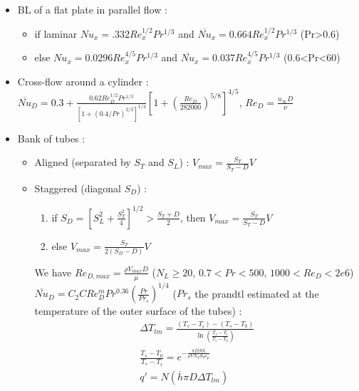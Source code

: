 \documentclass[../main.tex]{subfiles}
\begin{document}
\begin{itemize}
    \item BL of a flat plate in parallel flow : \begin{itemize}
        \item if laminar $Nu_x = .332 Re_x^{1/2} Pr^{1/3}$ and $\overline{Nu}_x = 0.664 Re_x^{1/2} Pr^{1/3}$ (Pr>0.6)\\
        \item else $Nu_x = 0.0296 Re_x^{4/5} Pr^{1/3}$ and $\overline{Nu}_x = 0.037 Re_x^{4/5} Pr^{1/3}$ (0.6<Pr<60)\\
    \end{itemize}
    \item Cross-flow around a cylinder : $\overline{Nu}_D = 0.3 + \frac{0.62Re_D^{1/2} Pr^{1/3}}{[1+(0.4/Pr)^{2/3}]^{1/4}} [1+(\frac{Re_D}{282000})^{5/8}]^{4/5}$, $Re_D = \frac{u_\infty D}{\nu}$\\
    \item Bank of tubes : \begin{itemize}
        \item Aligned (separated by $S_T$ and $S_L$) : $V_{max} = \frac{S_T}{S_T-D}V$\\
        \item Staggered (diagonal $S_D$) : \begin{enumerate}
            \item if $S_D = [S_L^2 + \frac{S_T^2}{4}]^{1/2} > \frac{S_T + D}{2}$, then $V_{max} = \frac{S_T}{S_T-D}V$\\
            \item else $V_{max} = \frac{S_T}{2(S_D-D)}V$\\
        \end{enumerate}
        We have $Re_{D,max} = \frac{\rho V_{max}D}{\mu}$ ($N_L \geq 20$, $0.7<Pr<500$, $1000<Re_D<2e6$) $\overline{Nu}_D = C_2 C Re_D^mPr^{0.36} (\frac{Pr}{Pr_s})^{1/4}$ ($Pr_s$ the prandtl estimated at the temperature of the outer surface of the tubes) : \begin{equation}
            \begin{gathered}
                \Delta T_{lm} = \frac{(T_s-T_i) - (T_s - T_0)}{\ln(\frac{T_s-T_i}{T_s-T_0})}\\
                \frac{T_s-T_0}{T_s-T_i} = e^{-\frac{\pi D N\overline{h}}{\rho V N_T S_T c_p}}\\
                q' = N(\overline{h} \pi D \Delta T_{lm})\\
            \end{gathered}
        \end{equation}
    \end{itemize}
\end{itemize}
\end{document}
